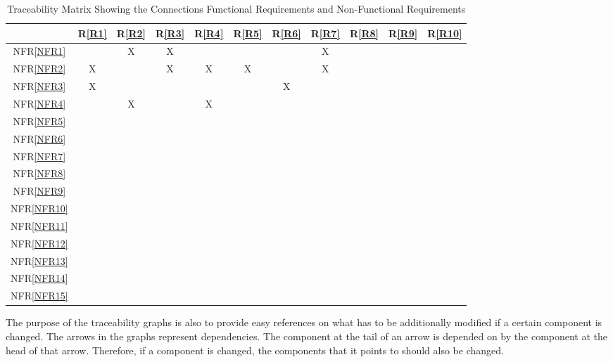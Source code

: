 \documentclass[12pt]{article}
\newcommand{\frref}[1]{R\ref{#1}}
\newcommand{\nfrref}[1]{NFR\ref{#1}}
\begin{document}
\begin{table}[h!]
\centering
\begin{tabular}{|c|c|c|c|c|c|c|c|c|c|c|}
\hline
	& \frref{R1}& \frref{R2}& \frref{R3}& \frref{R4}& \frref{R5}& \frref{R6}& \frref{R7} &\frref{R8} &\frref{R9}& \frref{R10} \\
\hline                    %
\nfrref{NFR1}         &   & X& X&   &   &   & X&   &   &\\ \hline
\nfrref{NFR2}         & X&   & X& X&  X&   & X&   &   & \\ \hline
\nfrref{NFR3}         & X&   &   &   &   & X&   &   &   & \\ \hline
\nfrref{NFR4}         &   & X&   & X&   &   &   &   &   & \\ \hline
\nfrref{NFR5}         &   &   &   &   &   &   &   &   &   & \\ \hline
\nfrref{NFR6}         &   &   &   &   &   &   &   &   &   & \\ \hline
\nfrref{NFR7}         &   &   &   &   &   &   &   &   &   & \\ \hline
\nfrref{NFR8}         &   &   &   &   &   &   &   &   &   & \\ \hline
\nfrref{NFR9}         &   &   &   &   &   &   &   &   &   & \\ \hline 
\nfrref{NFR10}       &   &   &   &   &   &   &   &   &   & \\ \hline
\nfrref{NFR11}       &   &   &   &   &   &   &   &   &   & \\ \hline
\nfrref{NFR12}       &   &   &   &   &   &   &   &   &   & \\ \hline
\nfrref{NFR13}       &   &   &   &   &   &   &   &   &   & \\ \hline
\nfrref{NFR14}       &   &   &   &   &   &   &   &   &   & \\ \hline
\nfrref{NFR15}       &   &   &   &   &   &   &   &   &   & \\ 
\hline
\end{tabular}
\caption{Traceability Matrix Showing the Connections Functional Requirements and Non-Functional Requirements}
\label{Table:R_trace}
\end{table}

The purpose of the traceability graphs is also to provide easy references on
what has to be additionally modified if a certain component is changed.  The
arrows in the graphs represent dependencies. The component at the tail of an
arrow is depended on by the component at the head of that arrow. Therefore, if a
component is changed, the components that it points to should also be
changed. 
\end{document}
